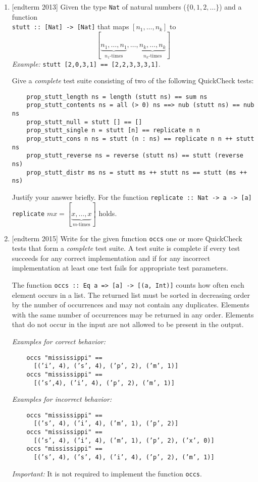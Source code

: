\documentclass{article}
\begin{document}
\begin{enumerate}
\item {[endterm 2013]} Given the type \verb|Nat| of natural numbers ($\{0,1,2,\dots\}$) and a function \\ \verb|stutt :: [Nat] -> [Nat]| that maps $[n_1, \dots, n_k]$ to
\[
[\underbrace{n_1, \dots, n_1}_{n_1\text{-times}}, \dots, \underbrace{n_k, \dots, n_k}_{n_k\text{-times}}]
\]
\textit{Example:} \verb|stutt [2,0,3,1] == [2,2,3,3,3,1]|. \par
Give a \textit{complete} test suite consisting of two of the following QuickCheck tests:
\begin{verbatim}
    prop_stutt_length ns = length (stutt ns) == sum ns
    prop_stutt_contents ns = all (> 0) ns ==> nub (stutt ns) == nub ns
    prop_stutt_null = stutt [] == []
    prop_stutt_single n = stutt [n] == replicate n n
    prop_stutt_cons n ns = stutt (n : ns) == replicate n n ++ stutt ns
    prop_stutt_reverse ns = reverse (stutt ns) == stutt (reverse ns)
    prop_stutt_distr ms ns = stutt ms ++ stutt ns == stutt (ms ++ ns)
\end{verbatim}
Justify your answer briefly. For the function \verb|replicate :: Nat -> a -> [a] replicate| $m x = [\underbrace{x, \dots, x}_{m\text{-times}}]$ holds.

\item {[endterm 2015]} Write for the given function \verb|occs| one or more QuickCheck tests that form a \textit{complete} test suite. A test suite is complete if every test succeeds for any correct implementation and if for any incorrect implementation at least one test fails for appropriate test parameters. \par
The function \verb|occs :: Eq a => [a] -> [(a, Int)]| counts how often each element occurs in a list. The returned list must be sorted in decreasing order by the number of occurrences and may not contain any duplicates. Elements with the same number of occurrences may be returned in any order. Elements that do not occur in the input are not allowed to be present in the output. \par
\textit{Examples for correct behavior:}
\begin{verbatim}
    occs "mississippi" ==
      [(’i’, 4), (’s’, 4), (’p’, 2), (’m’, 1)]
    occs "mississippi" ==
      [(’s’,4), (’i’, 4), (’p’, 2), (’m’, 1)]
\end{verbatim}
\textit{Examples for incorrect behavior:}
\begin{verbatim}
    occs "mississippi" ==
      [(’s’, 4), (’i’, 4), (’m’, 1), (’p’, 2)]
    occs "mississippi" ==
      [(’s’, 4), (’i’, 4), (’m’, 1), (’p’, 2), (’x’, 0)]
    occs "mississippi" ==
      [(’s’, 4), (’s’, 4), (’i’, 4), (’p’, 2), (’m’, 1)]
\end{verbatim}
\textit{Important:} It is not required to implement the function \verb|occs|.
\end{enumerate}
\end{document}
